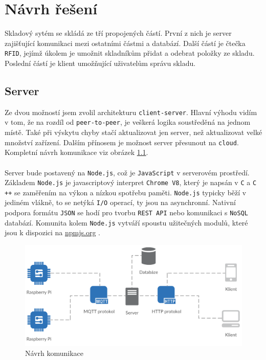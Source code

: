 \documentclass[czech,BP]{thesiskiv}
\begin{document}
	
	
	
	
	
	
\chapter{Návrh řešení}

Skladový sytém se skládá ze tří propojených částí. 
První z nich je server zajišťující komunikaci mezi ostatními částmi a databází.  
Další částí je čtečka \texttt{RFID}, jejímž úkolem je umožnit skladníkům přidat a odebrat položky ze skladu.  
Poslední částí je klient umožňující uživatelům správu skladu.

		\section{Server} 
			Ze dvou možností jsem zvolil architekturu \texttt{client-server}. Hlavní výhodu vidím v tom, že na rozdíl od \texttt{peer-to-peer}, je veškerá logika soustředěná na jednom místě. Také při výskytu chyby stačí aktualizovat jen server, než aktualizovat velké množství zařízení.
			Dalším přínosem je možnost server přesunout na \texttt{cloud}. 
			Kompletní návrh komunikace viz obrázek \ref{fig:network}.
			\\\\
			Server bude postavený na \texttt{Node.js}\cite{tilkov2010node}, což je \texttt{JavaScript} v serverovém prostředí. Základem \texttt{Node.js} je javascriptový interpret \texttt{Chrome V8}, který je napsán v \texttt{C} a \texttt{C ++} se zaměřením na výkon a nízkou spotřebu paměti. \texttt{Node.js} typicky běží v jediném vlákně, to se netýká \texttt{I/O} operací, ty jsou na asynchronní. Nativní podpora formátu \texttt{JSON} se hodí pro tvorbu \texttt{REST API} nebo komunikaci s \texttt{NoSQL} databází. Komunita kolem \texttt{Node.js} vytváří spoustu užitečných modulů, které jsou k dispozici na \url{npmjs.org} \cite{tilkov2010node}.
				
				
				
		
		\begin{figure}[H]
   		 	\centering
			\includegraphics[width=1\textwidth]{../diagrams/network.png}	
			\caption{Návrh komunikace}
    		\label{fig:network}
		\end{figure}
\end{document}
